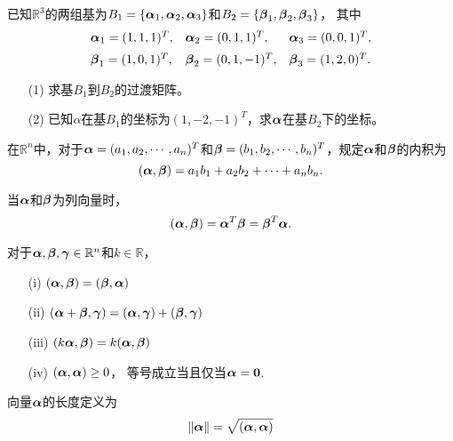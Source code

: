 \begin{frame}
  
  \begin{li}
    已知$\mathbb R^3$的两组基为$B_1=\{\boldsymbol{\alpha}_1,\boldsymbol{\alpha}_2,\boldsymbol{\alpha}_3\}$和$B_2=\{\boldsymbol{\beta}_1,\boldsymbol{\beta}_2,\boldsymbol{\beta}_3\}$，
    其中
    $$
    \begin{array}{lll}
      \boldsymbol{\alpha}_1=(1,1,1)^T,&\boldsymbol{\alpha}_2=(0,1,1)^T,&\boldsymbol{\alpha}_3=(0,0,1)^T, \\[0.2cm]
      \boldsymbol{\beta}_1=(1,0,1)^T,&\boldsymbol{\beta}_2=(0,1,-1)^T,&\boldsymbol{\beta}_3=(1,2,0)^T.  
    \end{array}
    $$
    \begin{itemize}
    \item[(1)] 求基$B_1$到$B_2$的过渡矩阵。
    \item[(2)] 已知$\alpha$在基$B_1$的坐标为$(1,-2,-1)^T$，求$\boldsymbol{\alpha}$在基$B_2$下的坐标。
    \end{itemize}
    
  \end{li}
  
\end{frame}



\begin{frame}
  
  \begin{dingyi}[内积]
    在$\mathbb R^n$中，对于$\boldsymbol{\alpha}=(a_1,a_2,\cdots,a_n)^T$和$\boldsymbol{\beta}=(b_1,b_2,\cdots,b_n)^T$，规定$\boldsymbol{\alpha}$和$\boldsymbol{\beta}$的内积为 
    $$
    (\boldsymbol{\alpha},\boldsymbol{\beta})=a_1b_1+a_2b_2+\cdots+a_nb_n.
    $$
  \end{dingyi}
  当$\boldsymbol{\alpha}$和$\boldsymbol{\beta}$为列向量时，
  $$
  (\boldsymbol{\alpha},\boldsymbol{\beta})=\boldsymbol{\alpha}^T\boldsymbol{\beta}=\boldsymbol{\beta}^T\boldsymbol{\alpha}.
  $$
  
\end{frame}

\begin{frame}
  
  \begin{xingzhi}
    对于$\boldsymbol{\alpha},\boldsymbol{\beta},\boldsymbol{\gamma}\in\mathbb R^n$和$k\in\mathbb R$，
    \begin{itemize}
    \item[(i)]   $(\boldsymbol{\alpha},\boldsymbol{\beta})=(\boldsymbol{\beta},\boldsymbol{\alpha})$
    \item[(ii)]  $(\boldsymbol{\alpha}+\boldsymbol{\beta},\boldsymbol{\gamma})=(\boldsymbol{\alpha},\boldsymbol{\gamma})+(\boldsymbol{\beta},\boldsymbol{\gamma})$
    \item[(iii)] $(k\boldsymbol{\alpha},\boldsymbol{\beta})=k(\boldsymbol{\alpha},\boldsymbol{\beta})$
    \item[(iv)]  $(\boldsymbol{\alpha},\boldsymbol{\alpha})\ge0$， 等号成立当且仅当$\alphabd=\M0$.
    \end{itemize}
  \end{xingzhi}
  
  \begin{dingyi}[向量长度]
    向量$\boldsymbol{\alpha}$的长度定义为
    $$
    \|\boldsymbol{\alpha}\|=\sqrt{(\boldsymbol{\alpha},\boldsymbol{\alpha})}
    $$
  \end{dingyi}
  
\end{frame}


